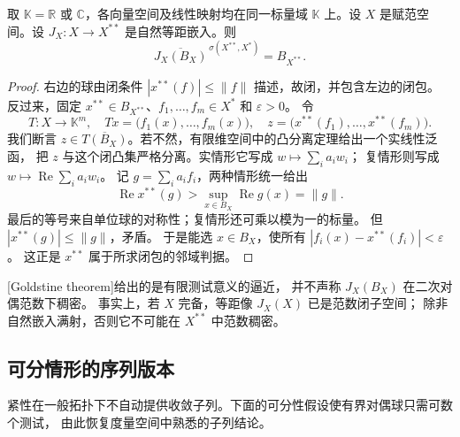 \begin{theorem}[Goldstine]\label{b1:thm:goldstine}
取 \(\mathbb K=\mathbb R\) 或 \(\mathbb C\)，各向量空间及线性映射均在同一标量域 \(\mathbb K\) 上。设 \(X\) 是赋范空间。设 \(J_X:X\to X^{**}\) 是自然等距嵌入。则
\[
 \overline{J_X(B_X)}^{\,\sigma(X^{**},X^*)}=B_{X^{**}}.
\]
\end{theorem}
\begin{proof}
右边的球由闭条件 \(|x^{**}(f)|\leq\|f\|\) 描述，故\WeakStar{}闭，并包含左边的闭包。
反过来，固定 \(x^{**}\in B_{X^{**}}\)、\(f_1,\ldots,f_m\in X^*\) 和 \(\varepsilon>0\)。
令
\[
 T:X\to\mathbb K^m,\quad Tx=\bigl(f_1(x),\ldots,f_m(x)\bigr),
 \quad z=\bigl(x^{**}(f_1),\ldots,x^{**}(f_m)\bigr).
\]
我们断言 \(z\in\overline{T(B_X)}\)。若不然，有限维空间中的凸分离定理给出一个实线性泛函，
把 \(z\) 与这个闭凸集严格分离。实情形它写成 \(w\mapsto\sum_i a_iw_i\)；
复情形则写成 \(w\mapsto\operatorname{Re}\sum_i a_iw_i\)。
记 \(g=\sum_i a_if_i\)，两种情形统一给出
\[
 \operatorname{Re}x^{**}(g)>
 \sup_{x\in B_X}\operatorname{Re}g(x)=\|g\|.
\]
最后的等号来自单位球的对称性；复情形还可乘以模为一的标量。
但 \(|x^{**}(g)|\leq\|g\|\)，矛盾。
于是能选 \(x\in B_X\)，使所有 \(|f_i(x)-x^{**}(f_i)|<\varepsilon\)。
这正是 \(x^{**}\) 属于所求\WeakStar{}闭包的邻域判据。
\end{proof}

[Goldstine theorem]给出的是有限测试意义的逼近，
并不声称 \(J_X(B_X)\) 在二次对偶范数下稠密。
事实上，若 \(X\) 完备，等距像 \(J_X(X)\) 已是范数闭子空间；
除非自然嵌入满射，否则它不可能在 \(X^{**}\) 中范数稠密。

\subsection{可分情形的序列版本}
\label{b1:subsec:090303}

紧性在一般拓扑下不自动提供收敛子列。下面的可分性假设使有界对偶球只需可数个测试，
由此恢复度量空间中熟悉的子列结论。

